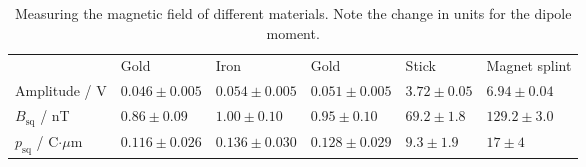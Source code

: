 \begin{table}[htb]
\caption{Measuring the magnetic field of different materials. 
    Note the change in units for the dipole moment.}
\begin{tabular}{ l| p{2.3cm}|p{2.3cm}|p{2.3cm}|p{2.3cm}|p{2.3cm}}
 \rowcolor{tabcolor}& Gold & Iron & Gold  & Stick & Magnet splint \\ 
Amplitude / V &$0.046 \pm 0.005$&$0.054 \pm 0.005$&$0.051 \pm 0.005$&$3.72 \pm 0.05$&$6.94 \pm 0.04$\\
$B_{\mathrm{sq}}$ / nT  &$0.86 \pm 0.09$ &$1.00 \pm 0.10$ &$0.95 \pm 0.10$ &$69.2 \pm 1.8$ &$129.2 \pm 3.0$ \\ 
$p_{\mathrm{sq}}$ / C$\cdot\mu$m  &$0.116 \pm 0.026$&$0.136 \pm 0.030$&$0.128 \pm 0.029$&$9.3 \pm 1.9$&$17 \pm 4$\\
\end{tabular}
\label{tab:materials}
\end{table}
\FloatBarrier
